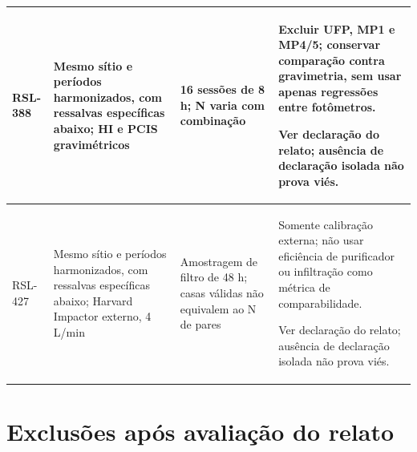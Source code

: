 \begin{longtable}{|P{0.12\textwidth}|P{0.28\textwidth}|P{0.28\textwidth}|P{\arrayrulewidth\relax}|}
RSL-388 & Mesmo sítio e períodos harmonizados, com ressalvas específicas abaixo; HI e PCIS gravimétricos & 16 sessões de 8 h; N varia com combinação & Excluir UFP, MP1 e MP4/5; conservar comparação contra gravimetria, sem usar apenas regressões entre fotômetros.\par\medskip Ver declaração do relato; ausência de declaração isolada não prova viés.\\\hline
RSL-427 & Mesmo sítio e períodos harmonizados, com ressalvas específicas abaixo; Harvard Impactor externo, 4 L/min & Amostragem de filtro de 48 h; casas válidas não equivalem ao N de pares & Somente calibração externa; não usar eficiência de purificador ou infiltração como métrica de comparabilidade.\par\medskip Ver declaração do relato; ausência de declaração isolada não prova viés.\\\hline
\end{longtable}
\endgroup

\section*{Exclusões após avaliação do relato}

